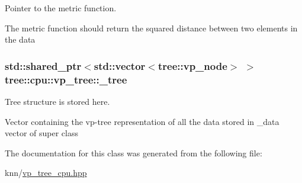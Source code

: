 Pointer to the metric function. 

The metric function should return the squared distance between two elements in the data \hypertarget{classtree_1_1cpu_1_1vp__tree_ada2f4290b6e25b4d4db7421b64690baa}{}
\subsubsection[{\+\_\+tree}]{\setlength{\rightskip}{0pt plus 5cm}std\+::shared\+\_\+ptr$<$std\+::vector$<${\bf tree\+::vp\+\_\+node}$>$ $>$ tree\+::cpu\+::vp\+\_\+tree\+::\+\_\+tree\hspace{0.3cm}{\ttfamily [protected]}}\label{classtree_1_1cpu_1_1vp__tree_ada2f4290b6e25b4d4db7421b64690baa}


Tree structure is stored here. 

Vector containing the vp-\/tree representation of all the data stored in \+\_\+data vector of super class 

The documentation for this class was generated from the following file\+:\begin{DoxyCompactItemize}
\item 
knn/\hyperlink{vp__tree__cpu_8hpp}{vp\+\_\+tree\+\_\+cpu.\+hpp}\end{DoxyCompactItemize}
